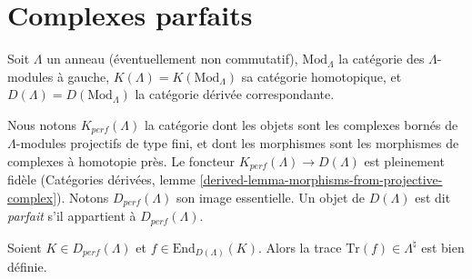 \section{Complexes parfaits}
\label{section-perfect}

\noindent
Soit $\Lambda$ un anneau (éventuellement non commutatif), $\text{Mod}_{\Lambda}$ la
catégorie des $\Lambda$-modules à gauche, $K(\Lambda) = K(\text{Mod}_\Lambda)$ sa
catégorie homotopique, et $D(\Lambda)= D(\text{Mod}_\Lambda)$ la catégorie dérivée
correspondante.

\begin{definition}
\label{definition-perfect}
Nous notons $K_{perf}(\Lambda)$ la catégorie dont les objets sont les complexes bornés
de $\Lambda$-modules projectifs de type fini, et dont les morphismes sont les
morphismes de complexes à homotopie près. Le foncteur $K_{perf}(\Lambda)\to
D(\Lambda)$ est pleinement fidèle (Catégories dérivées, lemme
\ref{derived-lemma-morphisms-from-projective-complex}).
Notons $D_{perf}(\Lambda)$ son image essentielle.
Un objet de $D(\Lambda)$ est dit {\it parfait} s'il appartient à
$D_{perf}(\Lambda)$.
\end{definition}

\begin{proposition}
\label{proposition-trace-well-defined}
Soient $K\in D_{perf}(\Lambda)$ et $f\in \text{End}_{D(\Lambda)}(K)$. Alors la
trace $\text{Tr}(f)\in \Lambda^\natural$ est bien définie.
\end{proposition}

